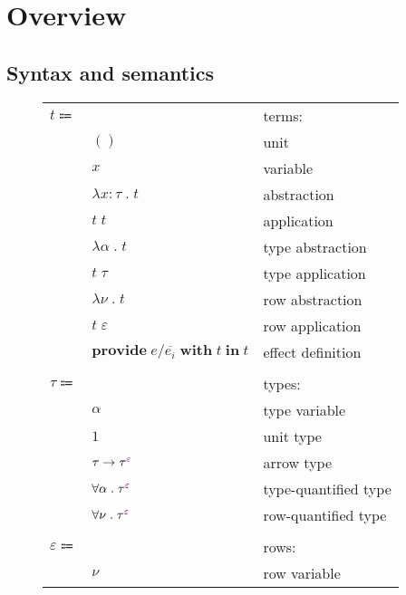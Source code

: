 \documentclass[12pt]{article}
\newcommand\anno[2]{#1 : #2}
\newcommand\term{t}
\newcommand\eunit{()}
\newcommand\evar{x}
\newcommand\eabs[2]{\lambda #1 \; . \; #2}
\newcommand\eapp[2]{#1 \; #2}
\newcommand\etabs[2]{\lambda #1 \; . \; #2}
\newcommand\etapp[2]{#1 \; #2}
\newcommand\eprovide[4]{\textbf{provide} \; #1 / #2 \; \textbf{with} \; #3 \; \textbf{in} \; #4}
\newcommand\tembellished[2]{{#1}^{\textcolor{violet}{#2}}}
\newcommand\type{\tau}
\newcommand\tvar{\alpha}
\newcommand\tunit{1}
\newcommand\tarrow[2]{#1 \rightarrow #2}
\newcommand\tforall[2]{\forall #1 \; . \; #2}
\newcommand\row{\varepsilon}
\newcommand\rvar{\nu}
\newcommand\effect{e}
\begin{document}
  \section{Overview}

    \subsection{Syntax and semantics}

      \begin{figure}[H]
        \begin{mdframed}[backgroundcolor=none]
          \begin{center}
            \begin{tabular}{l l l}
              $\term \Coloneqq $ & & terms: \\
              & $\eunit$ & unit \\
              & $\evar$ & variable \\
              & $\eabs{\anno{\evar}{\type}}{\term}$ & abstraction \\
              & $\eapp{\term}{\term}$ & application \\
              & $\etabs{\tvar}{\term}$ & type abstraction \\
              & $\etapp{\term}{\type}$ & type application \\
              & $\etabs{\rvar}{\term}$ & row abstraction \\
              & $\etapp{\term}{\row}$ & row application \\
              & $\eprovide{\effect}{\overline{\effect_i}}{\term}{\term}$ & effect definition \\
              \\
              $\type \Coloneqq$ & & types: \\
              & $\tvar$ & type variable \\
              & $\tunit$ & unit type \\
              & $\tarrow{\type}{\tembellished{\type}{\row}}$ & arrow type \\
              & $\tforall{\tvar}{\tembellished{\type}{\row}}$ & type-quantified type \\
              & $\tforall{\rvar}{\tembellished{\type}{\row}}$ & row-quantified type \\
              \\
              $\row \Coloneqq$ & & rows: \\
              & $\rvar$ & row variable \\

\end{tabular}
\end{center}
\end{mdframed}
\end{figure}
\end{document}
